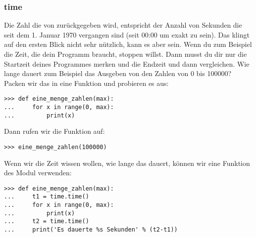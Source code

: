 \subsubsection*{time}
Die Zahl die von  zurückgegeben wird, entspricht der Anzahl von Sekunden die seit dem 1. Januar 1970 vergangen sind (seit 00:00 um exakt zu sein). Das klingt auf den ersten Blick nicht sehr nützlich, kann es aber sein. Wenn du zum Beispiel die Zeit, die dein Programm braucht, stoppen willst. Dann musst du dir nur die Startzeit deines Programmes merken und die Endzeit und dann vergleichen. Wie lange dauert zum Beispiel das Ausgeben von den Zahlen von 0 bis 100000? Packen wir das in eine Funktion und probieren es aus:

\begin{Verbatim}[frame=single]
>>> def eine_menge_zahlen(max):
...     for x in range(0, max):
...         print(x)
\end{Verbatim}

\noindent
Dann rufen wir die Funktion auf:

\begin{Verbatim}[frame=single]
>>> eine_menge_zahlen(100000)
\end{Verbatim}

\noindent
Wenn wir die Zeit wissen wollen, wie lange das dauert, können wir eine Funktion des  Modul verwenden:

\begin{Verbatim}[frame=single]
>>> def eine_menge_zahlen(max):
...     t1 = time.time()
...     for x in range(0, max):
...         print(x)
...     t2 = time.time()
...     print('Es dauerte %s Sekunden' % (t2-t1))
\end{Verbatim}

